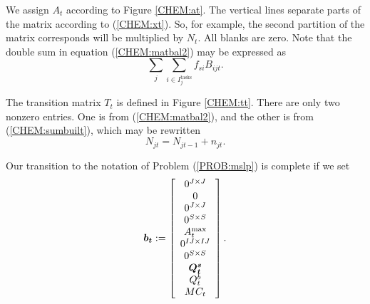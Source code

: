 We assign $A_t$ according to Figure \ref{CHEM:at}.  The vertical lines separate parts of the matrix according to (\ref{CHEM:xt}).  So, for example, the second partition of the matrix corresponds will be multiplied by $N_t$.  All blanks are zero.  Note that the double sum in equation (\ref{CHEM:matbal2}) may be expressed as
\[
\sum_j \sum_{i\in I_j^{\text{tasks}}} f_{si} B_{ijt}.
\]

The transition matrix $T_t$ is defined in Figure \ref{CHEM:tt}.  There are only two nonzero entries.  One is from (\ref{CHEM:matbal2}), and the other is from (\ref{CHEM:sumbuilt}), which may be rewritten
\[
N_{jt} = N_{jt-1} + n_{jt}.
\]

Our transition to the notation of Problem (\ref{PROB:mslp}) is complete if we set
\begin{equation*}
\mathbf{\boldsymbol{b_t}} := \left[
\begin{array}{c}
	0^{J\times J}\\
	0\\
	0^{J\times J}\\
	0^{S\times S}\\
	A^{\text{max}}_t\\
	0^{IJ\times IJ}\\
	0^{S\times S}\\
	\mathbf{\boldsymbol{Q^s_t}}\\
	Q^b_t\\
	MC_t
\end{array}
\right].
\end{equation*}




